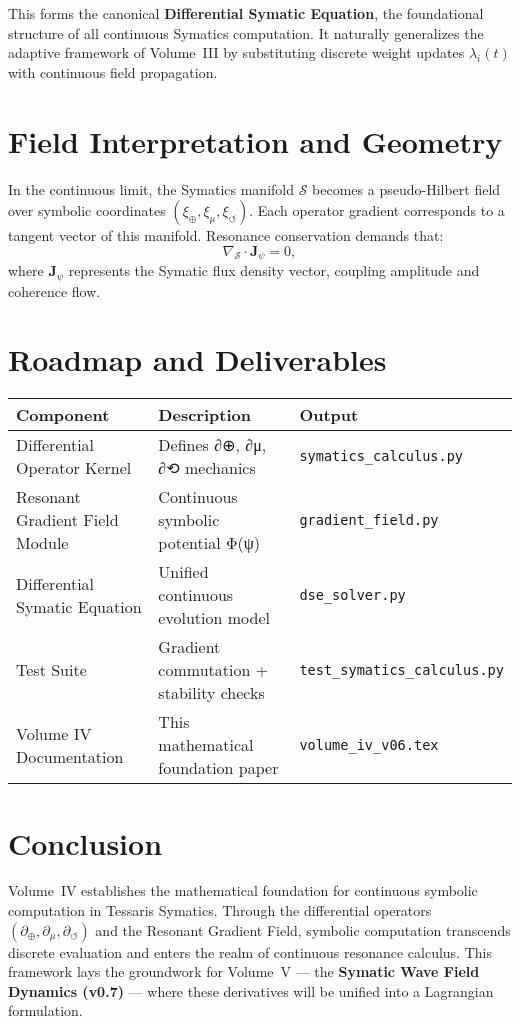 \documentclass[11pt]{article}
\begin{document}
This forms the canonical \textbf{Differential Symatic Equation}, the foundational structure of all continuous Symatics computation.
It naturally generalizes the adaptive framework of Volume~III by substituting discrete weight updates $\lambda_i(t)$ with continuous field propagation.

\section{Field Interpretation and Geometry}
In the continuous limit, the Symatics manifold $\mathcal{S}$ becomes a pseudo-Hilbert field over symbolic coordinates $(\xi_\oplus,\xi_\mu,\xi_\circlearrowleft)$.
Each operator gradient corresponds to a tangent vector of this manifold.
Resonance conservation demands that:
\[
\nabla_{\mathcal{S}} \cdot \mathbf{J}_\psi = 0,
\]
where $\mathbf{J}_\psi$ represents the Symatic flux density vector, coupling amplitude and coherence flow.

\section{Roadmap and Deliverables}
\begin{center}
\begin{tabular}{lll}
\toprule
\textbf{Component} & \textbf{Description} & \textbf{Output}\\
\midrule
Differential Operator Kernel & Defines ∂⊕, ∂μ, ∂⟲ mechanics & \texttt{symatics\_calculus.py}\\
Resonant Gradient Field Module & Continuous symbolic potential Φ(ψ) & \texttt{gradient\_field.py}\\
Differential Symatic Equation & Unified continuous evolution model & \texttt{dse\_solver.py}\\
Test Suite & Gradient commutation + stability checks & \texttt{test\_symatics\_calculus.py}\\
Volume IV Documentation & This mathematical foundation paper & \texttt{volume\_iv\_v06.tex}\\
\bottomrule
\end{tabular}
\end{center}

\section{Conclusion}
Volume~IV establishes the mathematical foundation for continuous symbolic computation in Tessaris Symatics.
Through the differential operators $(\partial_\oplus,\partial_\mu,\partial_\circlearrowleft)$ and the Resonant Gradient Field, symbolic computation transcends discrete evaluation and enters the realm of continuous resonance calculus.
This framework lays the groundwork for Volume~V — the \textbf{Symatic Wave Field Dynamics (v0.7)} — where these derivatives will be unified into a Lagrangian formulation.
\end{document}
